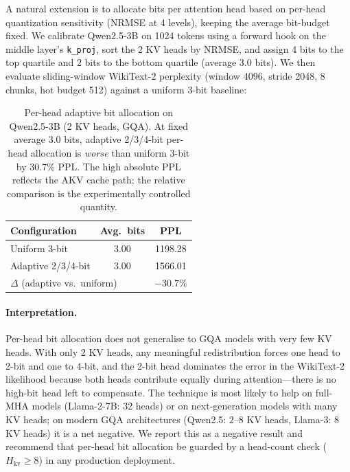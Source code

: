 \documentclass[11pt,a4paper]{article}
\begin{document}
A natural extension is to allocate bits per attention head based on per-head quantization sensitivity (NRMSE at 4 levels), keeping the average bit-budget fixed. We calibrate Qwen2.5-3B on 1024 tokens using a forward hook on the middle layer's \texttt{k\_proj}, sort the 2 KV heads by NRMSE, and assign 4 bits to the top quartile and 2 bits to the bottom quartile (average 3.0 bits). We then evaluate sliding-window WikiText-2 perplexity (window 4096, stride 2048, 8 chunks, hot budget 512) against a uniform 3-bit baseline:

\begin{table}[h]
\centering
\small
\begin{tabular}{lcc}
\toprule
\textbf{Configuration} & \textbf{Avg.\ bits} & \textbf{PPL} \\
\midrule
Uniform 3-bit      & 3.00 & 1198.28 \\
Adaptive 2/3/4-bit & 3.00 & 1566.01 \\
\midrule
\multicolumn{2}{l}{$\Delta$ (adaptive vs.\ uniform)} & \textbf{$-30.7\%$} \\
\bottomrule
\end{tabular}
\caption{Per-head adaptive bit allocation on Qwen2.5-3B (2 KV heads, GQA). At fixed average 3.0 bits, adaptive 2/3/4-bit per-head allocation is \emph{worse} than uniform 3-bit by 30.7\% PPL. The high absolute PPL reflects the AKV cache path; the relative comparison is the experimentally controlled quantity.}
\label{tab:per-head-ablation}
\end{table}

\paragraph{Interpretation.} Per-head bit allocation does not generalise to GQA models with very few KV heads. With only 2 KV heads, any meaningful redistribution forces one head to 2-bit and one to 4-bit, and the 2-bit head dominates the error in the WikiText-2 likelihood because both heads contribute equally during attention---there is no high-bit head left to compensate. The technique is most likely to help on full-MHA models (Llama-2-7B: 32 heads) or on next-generation models with many KV heads; on modern GQA architectures (Qwen2.5: 2--8 KV heads, Llama-3: 8 KV heads) it is a net negative. We report this as a negative result and recommend that per-head bit allocation be guarded by a head-count check ($H_{\text{kv}} \geq 8$) in any production deployment.

\end{document}
